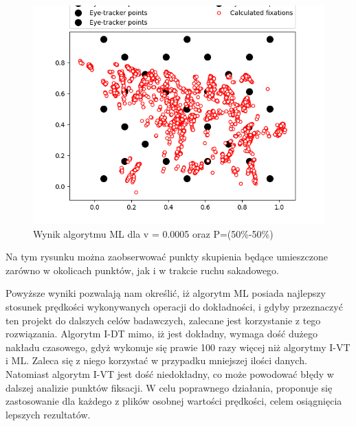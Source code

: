 \begin{figure}[H]
    \centering
    \captionsetup{justification=centering,margin=2cm}
    \includegraphics[width=0.8\linewidth]{resources/ml-incorrect.png}
    \caption{Wynik algorytmu ML dla v = 0.0005 oraz P=(50\%-50\%)}
    \label{fig:incorrectml}
\end{figure}
Na tym rysunku można zaobserwować punkty skupienia będące umieszczone zarówno w okolicach punktów, jak i w trakcie ruchu sakadowego.\par
Powyższe wyniki pozwalają nam określić, iż algorytm ML posiada najlepszy stosunek prędkości wykonywanych operacji do dokładności, i gdyby przeznaczyć ten projekt do dalszych celów badawczych, zalecane jest korzystanie z tego rozwiązania. Algorytm I-DT mimo, iż jest dokładny, wymaga dość dużego nakładu czasowego, gdyż wykonuje się prawie 100 razy więcej niż algorytmy I-VT i ML. Zaleca się z niego korzystać w przypadku mniejszej ilości danych. Natomiast algorytm I-VT jest dość niedokładny, co może powodować błędy w dalszej analizie punktów fiksacji. W celu poprawnego działania, proponuje się zastosowanie dla każdego z plików osobnej wartości prędkości, celem osiągnięcia lepszych rezultatów.